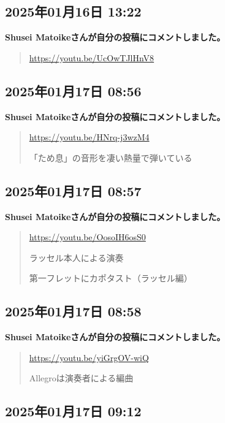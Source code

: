 \subsection*{2025年01月16日 13:22}

\textbf{Shusei Matoikeさんが自分の投稿にコメントしました。}

\begin{quote}
\url{https://youtu.be/UcOwTJlHnV8}
\end{quote}

\subsection*{2025年01月17日 08:56}

\textbf{Shusei Matoikeさんが自分の投稿にコメントしました。}

\begin{quote}
\url{https://youtu.be/HNrq-j3wzM4}

「ため息」の音形を凄い熱量で弾いている
\end{quote}

\subsection*{2025年01月17日 08:57}

\textbf{Shusei Matoikeさんが自分の投稿にコメントしました。}

\begin{quote}
\url{https://youtu.be/OosoIH6osS0}

ラッセル本人による演奏

第一フレットにカポタスト（ラッセル編）
\end{quote}

\subsection*{2025年01月17日 08:58}

\textbf{Shusei Matoikeさんが自分の投稿にコメントしました。}

\begin{quote}
\url{https://youtu.be/yiGrgOV-wiQ}

Allegroは演奏者による編曲
\end{quote}

\subsection*{2025年01月17日 09:12}

